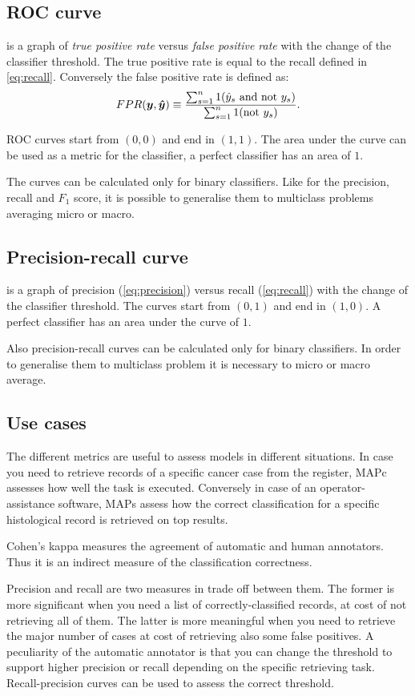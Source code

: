 \subsection{ROC curve} is a graph of \emph{true positive rate} versus
\emph{false positive rate} with the change of the classifier threshold. The
true positive rate is equal to the recall defined in
\cref{eq:recall}. Conversely the false positive rate is defined as:
\begin{equation}\label{eq:fpr}
FPR(\bm{y}, \bm{\hat y}) \equiv \frac{\sum_{s=1}^n 1(\hat
  y_s \text{ and not }y_s)}{\sum_{s=1}^n 1(\text{not }y_s)}.
\end{equation}

ROC curves start from $(0,0)$ and end in $(1,1)$. The area under
the curve can be used as a metric for the classifier, a perfect
classifier has an area of $1$.

The curves can be calculated only for binary classifiers. Like for the
precision, recall and $F_1$ score, it is possible to generalise them to
multiclass problems averaging micro or macro.

\subsection{Precision-recall curve} is a graph of precision
(\cref{eq:precision}) versus 
recall (\cref{eq:recall}) with the change of the classifier
threshold. The curves start from $(0,1)$ and end in $(1,0)$. A perfect
classifier has an area under the curve of $1$.

Also precision-recall curves can be calculated only for binary
classifiers. In order to generalise them to multiclass problem it is
necessary to micro or macro average.

\subsection{Use cases}
The different metrics are useful to assess models in different
situations. In case you need to retrieve records of a specific
cancer case from the register, MAPc assesses how
well the task is executed.
Conversely in case of an operator-assistance software, MAPs
assess how the correct classification
for a specific histological record is retrieved on top results. 

Cohen's kappa measures the agreement of automatic
and human annotators. Thus it is an indirect measure of the
classification correctness.

Precision and recall are two measures in trade off between them. The
former is more significant when you need a list of
correctly-classified records, at cost of not retrieving all of
them. The latter is more
meaningful when you need to retrieve the major number of cases at cost
of retrieving also some false positives. A peculiarity of the
automatic annotator is that you can change the threshold to support
higher precision or recall depending on the specific retrieving
task. Recall-precision
curves can be used to assess the correct threshold.



